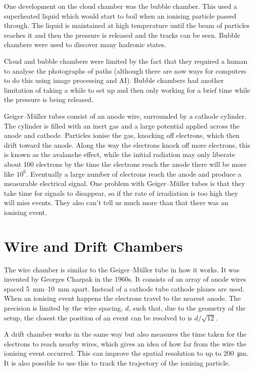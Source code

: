 \documentclass[fleqn]{NotesClass}
\begin{document}
    One development on the cloud chamber was the bubble chamber.
    This used a superheated liquid which would start to boil when an ionising particle passed through.
    The liquid is maintained at high temperature until the beam of particles reaches it and then the pressure is released and the tracks can be seen.
    Bubble chambers were used to discover many hadronic states.
    
    Cloud and bubble chambers were limited by the fact that they required a human to analyse the photographs of paths (although there are now ways for computers to do this using image processing and AI).
    Bubble chambers had another limitation of taking a while to set up and then only working for a brief time while the pressure is being released.
    
    Geiger--M\"uller tubes consist of an anode wire, surrounded by a cathode cylinder.
    The cylinder is filled with an inert gas and a large potential applied across the anode and cathode.
    Particles ionise the gas, knocking off electrons, which then drift toward the anode.
    Along the way the electrons knock off more electrons, this is known as the avalanche effect, while the initial radiation may only liberate about 100 electrons by the time the electrons reach the anode there will be more like \(10^6\).
    Eventually a large number of electrons reach the anode and produce a measurable electrical signal.
    One problem with Geiger--M\"uller tubes is that they take time for signals to disappear, so if the rate of irradiation is too high they will miss events.
    They also can't tell us much more than that there was an ionising event.
    
    \section{Wire and Drift Chambers}
    The wire chamber is similar to the Geiger--M\"uller tube in how it works.
    It was invented by Georges Charpak in the 1960s.
    It consists of an array of anode wires spaced \qtyrange{5}{10}{\milli\metre} apart.
    Instead of a cathode tube cathode planes are used.
    When an ionising event happens the electrons travel to the nearest anode.
    The precision is limited by the wire spacing, \(d\), such that, due to the geometry of the setup, the closest the position of an event can be resolved to is \(d/\sqrt{12}\).
    
    A drift chamber works in the same way but also measures the time taken for the electrons to reach nearby wires, which gives an idea of how far from the wire the ionising event occurred.
    This can improve the spatial resolution to up to \qty{200}{\micro\metre}.
    It is also possible to use this to track the trajectory of the ionising particle.
    
\end{document}
